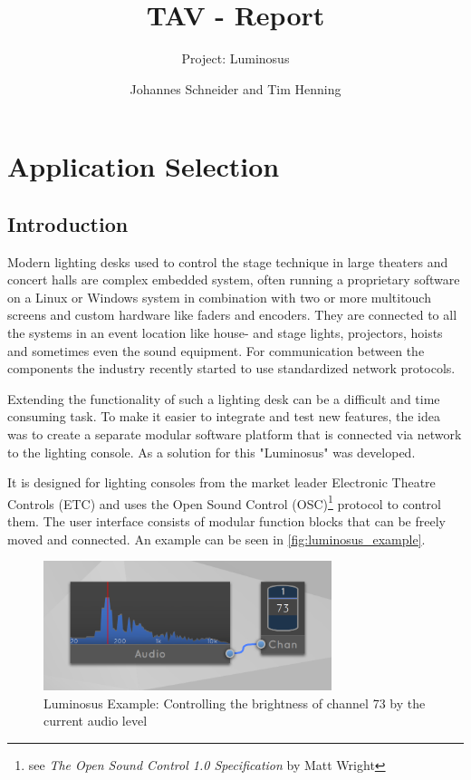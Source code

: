 \documentclass{scrreprt}
\title{TAV - Report}
\subtitle{Project: Luminosus}
\author{Johannes Schneider and Tim Henning}
\begin{document}
\maketitle

\tableofcontents

\setcounter{chapter}{-1}
\chapter{Application Selection}

\section{Introduction}

Modern lighting desks used to control the stage technique in large theaters and concert halls are complex embedded system, often running a proprietary software on a Linux or Windows system in combination with two or more multitouch screens and custom hardware like faders and encoders. They are connected to all the systems in an event location like house- and stage lights, projectors, hoists and sometimes even the sound equipment. For communication between the components the industry recently started to use standardized network protocols.

Extending the functionality of such a lighting desk can be a difficult and time consuming task. To make it easier to integrate and test new features, the idea was to create a separate modular software platform that is connected via network to the lighting console. As a solution for this "Luminosus" was developed.

It is designed for lighting consoles from the market leader Electronic Theatre Controls (ETC) and uses the Open Sound Control (OSC)\footnote{see \textit{The Open Sound Control 1.0 Specification} by Matt Wright} protocol to control them. The user interface consists of modular function blocks that can be freely moved and connected. An example can be seen in \vref{fig:luminosus_example}.

\begin{figure}[h]
	\centering
	\includegraphics[width=0.75\textwidth]{img/luminosus_example}
	\caption[Luminosus Example]{Luminosus Example: Controlling the brightness of channel 73 by the current audio level}
	\label{fig:luminosus_example}
\end{figure}
\end{document}

